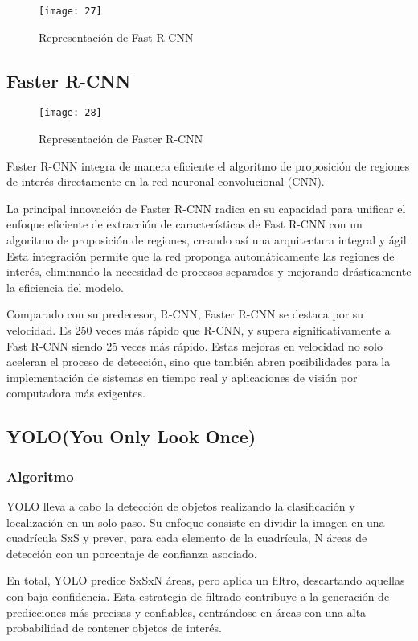 	\begin{figure}[ht]
	    \centering
		\texttt{[image: 27]}
		\caption{Representación de Fast R-CNN}
	\end{figure}
	
	\subsection{Faster R-CNN}
	
	\begin{wrapfigure}[16]{R}{.43\textwidth} 
		\centering
		\texttt{[image: 28]}
		\caption{Representación de Faster R-CNN}
	\end{wrapfigure}
	
	Faster R-CNN integra de manera eficiente el algoritmo de proposición de regiones de interés directamente en la red neuronal convolucional (CNN).
	
	La principal innovación de Faster R-CNN radica en su capacidad para unificar el enfoque eficiente de extracción de características de Fast R-CNN con un algoritmo de proposición de regiones, creando así una arquitectura integral y ágil. Esta integración permite que la red proponga automáticamente las regiones de interés, eliminando la necesidad de procesos separados y mejorando drásticamente la eficiencia del modelo.


	Comparado con su predecesor, R-CNN, Faster R-CNN se destaca por su velocidad. Es 250 veces más rápido que R-CNN, y supera significativamente a Fast R-CNN siendo 25 veces más rápido. Estas mejoras en velocidad no solo aceleran el proceso de detección, sino que también abren posibilidades para la implementación de sistemas en tiempo real y aplicaciones de visión por computadora más exigentes.
	
	\subsection{YOLO(You Only Look Once)}
	\subsubsection{Algoritmo}
	YOLO lleva a cabo la detección de objetos realizando la clasificación y localización en un solo paso. Su enfoque consiste en dividir la imagen en una cuadrícula SxS y prever, para cada elemento de la cuadrícula, N áreas de detección con un porcentaje de confianza asociado.
	
	En total, YOLO predice SxSxN áreas, pero aplica un filtro, descartando aquellas con baja confidencia. Esta estrategia de filtrado contribuye a la generación de predicciones más precisas y confiables, centrándose en áreas con una alta probabilidad de contener objetos de interés.
	

